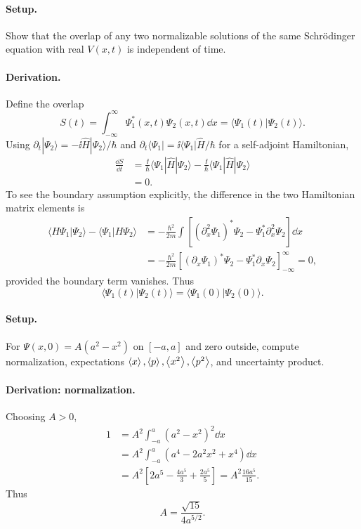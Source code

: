\paragraph{Setup.} Show that the overlap of any two normalizable solutions of the same Schrödinger equation with real $V(x,t)$ is independent of time.
\paragraph{Derivation.}
Define the overlap
\begin{equation}
S(t)=\int_{-\infty}^{\infty}\Psi_1^*(x,t)\Psi_2(x,t)\dd x
=\langle\Psi_1(t)|\Psi_2(t)\rangle.
\end{equation}
Using $\partial_t|\Psi_2\rangle=-\ii\hat H|\Psi_2\rangle/\hbar$ and
$\partial_t\langle\Psi_1|=\ii\langle\Psi_1|\hat H/\hbar$ for a self-adjoint Hamiltonian,
\begin{align}
\frac{\dd S}{\dd t}
&=\frac{\ii}{\hbar}\langle\Psi_1|\hat H|\Psi_2\rangle
-\frac{\ii}{\hbar}\langle\Psi_1|\hat H|\Psi_2\rangle\\
&=\boxed{0}.
\end{align}
To see the boundary assumption explicitly, the difference in the two Hamiltonian matrix elements is
\begin{align}
\langle H\Psi_1|\Psi_2\rangle-\langle\Psi_1|H\Psi_2\rangle
&=-\frac{\hbar^2}{2m}\int
\left[(\partial_x^2\Psi_1)^*\Psi_2-
\Psi_1^*\partial_x^2\Psi_2\right]\dd x\\
&=-\frac{\hbar^2}{2m}
\left[(\partial_x\Psi_1)^*\Psi_2-\Psi_1^*\partial_x\Psi_2
\right]_{-\infty}^{\infty}=0,
\end{align}
provided the boundary term vanishes.
Thus
\begin{equation}
\boxed{\langle\Psi_1(t)|\Psi_2(t)\rangle
=\langle\Psi_1(0)|\Psi_2(0)\rangle.}
\end{equation}

\paragraph{Setup.} For $\Psi(x,0)=A(a^2-x^2)$ on $[-a,a]$ and zero outside, compute normalization, expectations $\left\langle x\right\rangle,\left\langle p\right\rangle,\left\langle x^2\right\rangle,\left\langle p^2\right\rangle$, and uncertainty product.
\paragraph{Derivation: normalization.}
Choosing $A>0$,
\begin{align}
1&=A^2\int_{-a}^a(a^2-x^2)^2\dd x\\
&=A^2\int_{-a}^a(a^4-2a^2x^2+x^4)\dd x\\
&=A^2\left[2a^5-\frac{4a^5}3+\frac{2a^5}5\right]
=A^2\frac{16a^5}{15}.
\end{align}
Thus
\begin{equation}
\boxed{A=\frac{\sqrt{15}}{4a^{5/2}}.}
\end{equation}
